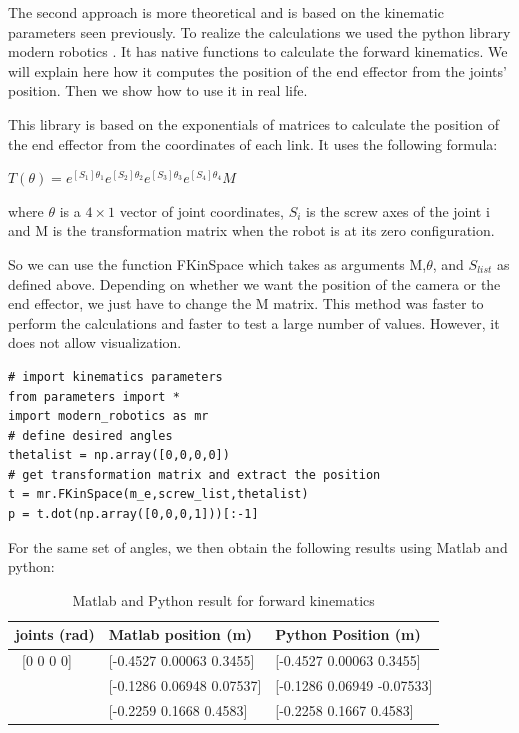 \bigbreak
The second approach is more theoretical and is based on the kinematic parameters seen previously. To realize the calculations we used the python library modern robotics \cite{Mordern_Robotic}. It has native functions to calculate the forward kinematics. We will explain here how it computes the position of the end effector from the joints' position. Then we show how to use it in real life.

\bigbreak
This library is based on the exponentials of matrices to calculate the position of the end effector from the coordinates of each link. It uses the following formula: 

\begin{center}
    $T(\theta) = e^{[S_1]\theta_1}e^{[S_2]\theta_2}e^{[S_3]\theta_3}e^{[S_4]\theta_4}M$    
\end{center}
where $\theta$ is a $4\times1$ vector of joint coordinates, $S_i$ is the screw axes of the joint i and M is the transformation matrix when the robot is at its zero configuration.


\bigbreak
So we can use the function FKinSpace which takes as arguments M,$\theta$, and $S_{list}$ as defined above. Depending on whether we want the position of the camera or the end effector, we just have to change the M matrix. This method was faster to perform the calculations and faster to test a large number of values. However, it does not allow visualization.

\begin{verbatim}
# import kinematics parameters
from parameters import * 
import modern_robotics as mr
# define desired angles 
thetalist = np.array([0,0,0,0])
# get transformation matrix and extract the position
t = mr.FKinSpace(m_e,screw_list,thetalist)
p = t.dot(np.array([0,0,0,1]))[:-1]
\end{verbatim}

\bigbreak
For the same set of angles, we then obtain the following results using Matlab and python: 
\begin{table}[ht]
    \centering
    \begin{tabular}{|p{4cm} | p{4.5cm} | p{4.5cm}|} 
        \hline
        \textbf{joints (rad)} & \textbf{Matlab position (m)} & \textbf{Python Position (m)}\\ [0.3ex] 
        \hline\
        [0 0 0 0] & [-0.4527 0.00063 0.3455] & [-0.4527 0.00063 0.3455] \\ 
        \hline
        [pi/4,-pi/3,0,pi/3] & [-0.1286 0.06948 0.07537] & [-0.1286  0.06949 -0.07533] \\ 
        \hline
        [pi/4,pi/6,-pi/6,pi/3]& [-0.2259 0.1668 0.4583] & [-0.2258  0.1667  0.4583] \\ 
        \hline
    \end{tabular}
    \caption{Matlab and Python result for forward kinematics}
\end{table}

